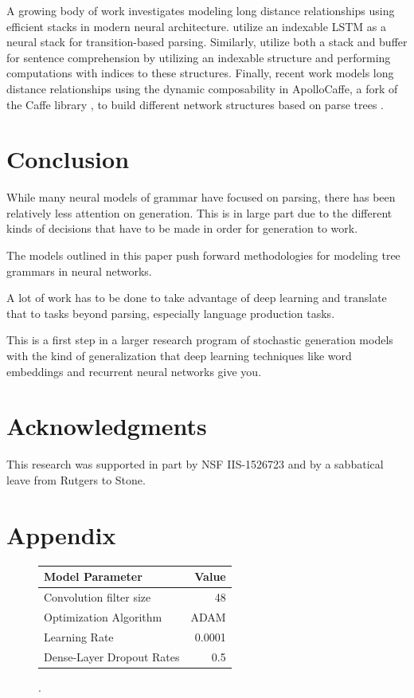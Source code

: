 \documentclass[11pt]{article}
\begin{document}
A growing body of work investigates modeling long distance relationships using efficient stacks in modern neural architecture. 
%
 utilize an indexable LSTM as a neural stack for transition-based parsing.  
%
Similarly,  utilize both a stack and buffer for sentence comprehension by utilizing an indexable structure and performing computations with indices to these structures. 
%
Finally, recent work models long distance relationships using the dynamic composability in ApolloCaffe, a fork of the Caffe library \cite{jia2014caffe}, to build different network structures based on parse trees \cite{Andreas2016LearningTC}.

\section{Conclusion}
\label{sec:conclusion}

While many neural models of grammar have focused on parsing, there has been relatively less attention on generation.
%
This is in large part due to the different kinds of decisions that have to be made in order for generation to work. 


The models outlined in this paper push forward methodologies for modeling tree grammars in neural networks. 

A lot of work has to be done to take advantage of deep learning and translate that to tasks beyond parsing, especially language production tasks.

This is a first step in a larger research program of stochastic generation models with the kind of generalization that deep learning techniques like word embeddings and recurrent neural networks give you. 

\section*{Acknowledgments}

This research was supported in part by NSF IIS-1526723 and by a
sabbatical leave from Rutgers to Stone.





\newpage
\appendix

\section{Appendix}


\begin{figure}
\centering
\begin{tabular}{|p{6cm}|r|}
\hline
Model Parameter & Value \\ \hline
Convolution filter size & 48 \\ \hline
Optimization Algorithm & ADAM \\ \hline
Learning Rate & 0.0001 \\ \hline
Dense-Layer Dropout Rates & 0.5 \\ \hline
\end{tabular}
\label{table:params}
\caption{.}
\end{figure}
\end{document}

